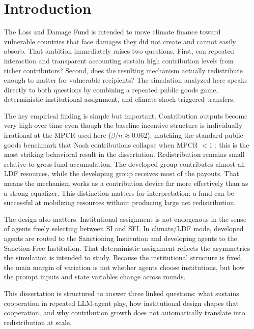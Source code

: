 \documentclass[12pt,letterpaper]{report}
\begin{document}
\chapter{Introduction}

The Loss and Damage Fund is intended to move climate finance toward vulnerable countries that face damages they did not create and cannot easily absorb. That ambition immediately raises two questions. First, can repeated interaction and transparent accounting sustain high contribution levels from richer contributors? Second, does the resulting mechanism actually redistribute enough to matter for vulnerable recipients? The simulation analyzed here speaks directly to both questions by combining a repeated public goods game, deterministic institutional assignment, and climate-shock-triggered transfers.

The key empirical finding is simple but important. Contribution outputs become very high over time even though the baseline incentive structure is individually irrational at the MPCR used here ($\beta/n \approx 0.062$), matching the standard public-goods benchmark that Nash contributions collapse when MPCR $< 1$ \citep{ledyard1995,isaacwalker1988,isaacwalkerwilliams1994}; this is the most striking behavioral result in the dissertation. Redistribution remains small relative to gross fund accumulation. The developed group contributes almost all LDF resources, while the developing group receives most of the payouts. That means the mechanism works as a contribution device far more effectively than as a strong equalizer. This distinction matters for interpretation: a fund can be successful at mobilizing resources without producing large net redistribution.

The design also matters. Institutional assignment is not endogenous in the sense of agents freely selecting between SI and SFI. In climate/LDF mode, developed agents are routed to the Sanctioning Institution and developing agents to the Sanction-Free Institution. That deterministic assignment reflects the asymmetries the simulation is intended to study. Because the institutional structure is fixed, the main margin of variation is not whether agents choose institutions, but how the prompt inputs and state variables change across rounds.

This dissertation is structured to answer three linked questions: what sustains cooperation in repeated LLM-agent play, how institutional design shapes that cooperation, and why contribution growth does not automatically translate into redistribution at scale.
\end{document}
